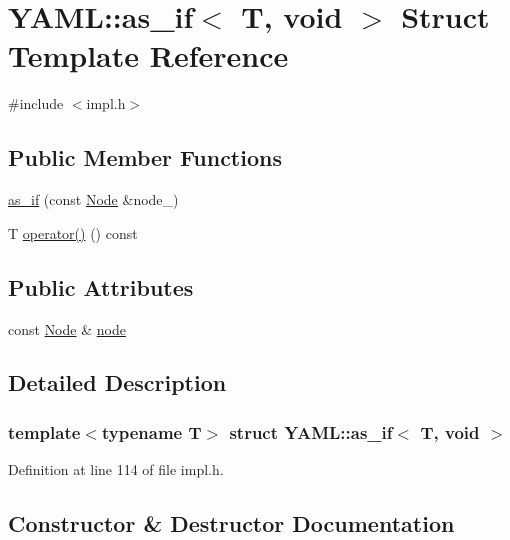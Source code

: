 \hypertarget{struct_y_a_m_l_1_1as__if_3_01_t_00_01void_01_4}{}\section{Y\+A\+ML\+::as\+\_\+if$<$ T, void $>$ Struct Template Reference}
\label{struct_y_a_m_l_1_1as__if_3_01_t_00_01void_01_4}


{\ttfamily \#include $<$impl.\+h$>$}

\subsection*{Public Member Functions}
\begin{DoxyCompactItemize}
\item 
\mbox{\hyperlink{struct_y_a_m_l_1_1as__if_3_01_t_00_01void_01_4_a98509111635223f826fc79f2d050a1ea}{as\+\_\+if}} (const \mbox{\hyperlink{class_y_a_m_l_1_1_node}{Node}} \&node\+\_\+)
\item 
T \mbox{\hyperlink{struct_y_a_m_l_1_1as__if_3_01_t_00_01void_01_4_ac86e98cb633d17ca863b9b34bbd7ffed}{operator()}} () const
\end{DoxyCompactItemize}
\subsection*{Public Attributes}
\begin{DoxyCompactItemize}
\item 
const \mbox{\hyperlink{class_y_a_m_l_1_1_node}{Node}} \& \mbox{\hyperlink{struct_y_a_m_l_1_1as__if_3_01_t_00_01void_01_4_a35de536b5f69760f1bb272295b9dd617}{node}}
\end{DoxyCompactItemize}


\subsection{Detailed Description}
\subsubsection*{template$<$typename T$>$\newline
struct Y\+A\+M\+L\+::as\+\_\+if$<$ T, void $>$}



Definition at line 114 of file impl.\+h.



\subsection{Constructor \& Destructor Documentation}
\mbox{\label{struct_y_a_m_l_1_1as__if_3_01_t_00_01void_01_4_a98509111635223f826fc79f2d050a1ea}} 
